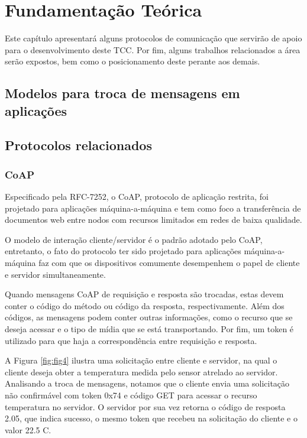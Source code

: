 \chapter{\label{chap:chap2} Fundamentação Teórica}

Este capítulo apresentará alguns protocolos de comunicação que servirão de apoio para o desenvolvimento deste TCC. 
Por fim, alguns trabalhos relacionados a área serão expostos, bem como o posicionamento deste perante aos demais.

\section{Modelos para troca de mensagens em aplicações}

\section{Protocolos relacionados}

\subsection{CoAP}

Especificado pela RFC-7252, o CoAP, protocolo de aplicação restrita, foi projetado para aplicações máquina-a-máquina
e tem como foco a transferência de documentos web entre nodos com recursos limitados em redes de baixa qualidade\cite{rfc7252}.

O modelo de interação cliente/servidor é o padrão adotado pelo CoAP, entretanto,
o fato do protocolo ter sido projetado para aplicações máquina-a-máquina faz com que os dispositivos comumente desempenhem o papel de cliente e servidor simultaneamente.

Quando mensagens CoAP de requisição e resposta são trocadas, estas devem conter o código do método ou código da resposta, respectivamente.
Além dos códigos, as mensagens podem conter outras informações, como o recurso que se deseja acessar e o tipo de mídia que se está transportando.
Por fim, um token é utilizado para que haja a correspondência entre requisição e resposta.

A Figura \ref{fig:fig4} ilustra uma solicitação entre cliente e servidor, na qual o cliente deseja obter a temperatura medida pelo sensor atrelado ao servidor.
Analisando a troca de mensagens, notamos que o cliente envia uma solicitação não confirmável com token 0x74 e código GET para acessar o recurso temperatura no servidor.
O servidor por sua vez retorna o código de resposta 2.05, que indica sucesso, o mesmo token que recebeu na solicitação do cliente e o valor 22.5 C.

